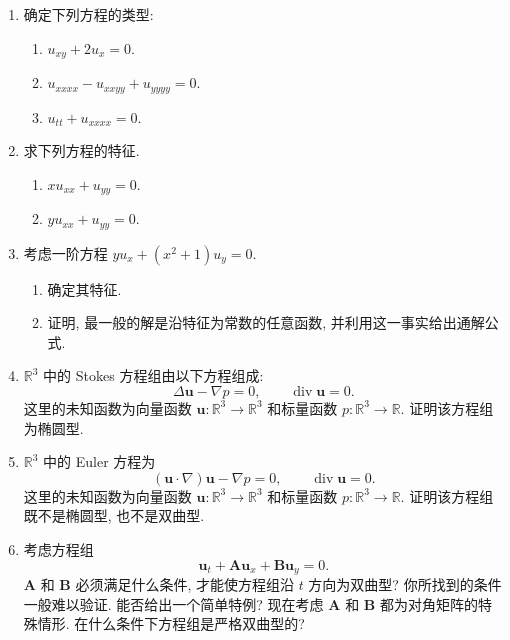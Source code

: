 \begin{enumerate}[label=\thesection.\arabic*.,ref=\thesection.\arabic*,start=1,series=book-problems]

\item\label{ex:determine-pde-types} 确定下列方程的类型:\begin{enumerate}[label=(\alph*)]
\item $u_{xy}+2u_x=0$.
\item $u_{xxxx}-u_{xxyy}+u_{yyyy}=0$.
\item $u_{tt}+u_{xxxx}=0$.
\end{enumerate}

\item\label{ex:find-second-order-characteristics} 求下列方程的特征.\begin{enumerate}[label=(\alph*)]
\item $xu_{xx}+u_{yy}=0$.
\item $yu_{xx}+u_{yy}=0$.
\end{enumerate}

\item\label{ex:first-order-characteristic-solution} 考虑一阶方程 $yu_x+(x^2+1)u_y=0$.
\begin{enumerate}[label=(\alph*)]
\item 确定其特征.
\item 证明, 最一般的解是沿特征为常数的任意函数, 并利用这一事实给出通解公式.
\end{enumerate}

\item\label{ex:stokes-ellipticity} $\mathbb{R}^3$ 中的 Stokes 方程组由以下方程组成:
\begin{equation}\label{eq:classification-stokes-system}
\Delta\bm{u}-\nabla p=0,\qquad\operatorname{div}\bm{u}=0.
\end{equation}
这里的未知函数为向量函数 $\bm{u}:\mathbb{R}^3\to\mathbb{R}^3$ 和标量函数 $p:\mathbb{R}^3\to\mathbb{R}$. 证明该方程组为椭圆型.

\item\label{ex:euler-system-type} $\mathbb{R}^3$ 中的 Euler 方程为
\begin{equation}\label{eq:classification-euler-system}
(\bm{u}\cdot\nabla)\bm{u}-\nabla p=0,\qquad\operatorname{div}\bm{u}=0.
\end{equation}
这里的未知函数为向量函数 $\bm{u}:\mathbb{R}^3\to\mathbb{R}^3$ 和标量函数 $p:\mathbb{R}^3\to\mathbb{R}$. 证明该方程组既不是椭圆型, 也不是双曲型.

\item\label{ex:hyperbolicity-two-matrices} 考虑方程组
\begin{equation}\label{eq:hyperbolic-two-spatial-directions-system}
\bm{u}_t+\bm{A}\bm{u}_x+\bm{B}\bm{u}_y=0.
\end{equation}
$\bm{A}$ 和 $\bm{B}$ 必须满足什么条件, 才能使方程组沿 $t$ 方向为双曲型? 你所找到的条件一般难以验证. 能否给出一个简单特例? 现在考虑 $\bm{A}$ 和 $\bm{B}$ 都为对角矩阵的特殊情形. 在什么条件下方程组是严格双曲型的?

\end{enumerate}
